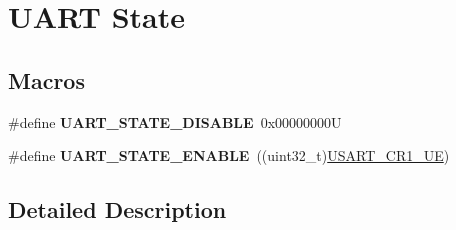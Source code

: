 \hypertarget{group___u_a_r_t___state}{}\section{U\+A\+RT State}
\label{group___u_a_r_t___state}
\subsection*{Macros}
\begin{DoxyCompactItemize}
\item 
\mbox{\label{group___u_a_r_t___state_gaf32492459be708981ebc5615194cdae9}} 
\#define {\bfseries U\+A\+R\+T\+\_\+\+S\+T\+A\+T\+E\+\_\+\+D\+I\+S\+A\+B\+LE}~0x00000000U
\item 
\mbox{\label{group___u_a_r_t___state_gab6b470dccef2a518a45554b171acff5b}} 
\#define {\bfseries U\+A\+R\+T\+\_\+\+S\+T\+A\+T\+E\+\_\+\+E\+N\+A\+B\+LE}~((uint32\+\_\+t)\mbox{\hyperlink{group___peripheral___registers___bits___definition_ga2bb650676aaae4a5203f372d497d5947}{U\+S\+A\+R\+T\+\_\+\+C\+R1\+\_\+\+UE}})
\end{DoxyCompactItemize}


\subsection{Detailed Description}
